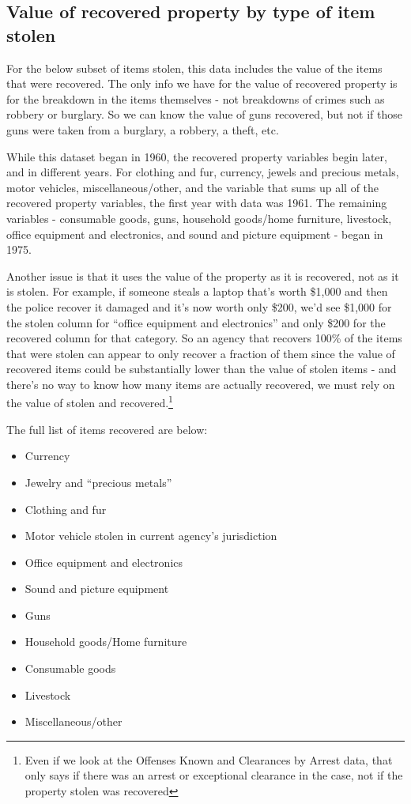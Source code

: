\documentclass[
]{krantz}
\providecommand{\tightlist}{%
  \setlength{\itemsep}{0pt}\setlength{\parskip}{0pt}}
\begin{document}
\subsection{Value of recovered property by type of item
stolen}\label{value-of-recovered-property-by-type-of-item-stolen}

For the below subset of items stolen, this data includes the
value of the items that were recovered. The only info we
have for the value of recovered property is for the
breakdown in the items themselves - not breakdowns of crimes
such as robbery or burglary. So we can know the value of
guns recovered, but not if those guns were taken from a
burglary, a robbery, a theft, etc.

While this dataset began in 1960, the recovered property
variables begin later, and in different years. For clothing
and fur, currency, jewels and precious metals, motor
vehicles, miscellaneous/other, and the variable that sums up
all of the recovered property variables, the first year with
data was 1961. The remaining variables - consumable goods,
guns, household goods/home furniture, livestock, office
equipment and electronics, and sound and picture equipment -
began in 1975.

Another issue is that it uses the value of the property as
it is recovered, not as it is stolen. For example, if
someone steals a laptop that's worth \$1,000 and then the
police recover it damaged and it's now worth only \$200,
we'd see \$1,000 for the stolen column for ``office
equipment and electronics'' and only \$200 for the recovered
column for that category. So an agency that recovers 100\%
of the items that were stolen can appear to only recover a
fraction of them since the value of recovered items could be
substantially lower than the value of stolen items - and
there's no way to know how many items are actually
recovered, we must rely on the value of stolen and
recovered.\footnote{Even if we look at the Offenses Known
  and Clearances by Arrest data, that only says if there was
  an arrest or exceptional clearance in the case, not if the
  property stolen was recovered}

The full list of items recovered are below:

\begin{itemize}
\tightlist
\item
  Currency
\item
  Jewelry and ``precious metals''
\item
  Clothing and fur
\item
  Motor vehicle stolen in current agency's jurisdiction
\item
  Office equipment and electronics
\item
  Sound and picture equipment
\item
  Guns
\item
  Household goods/Home furniture
\item
  Consumable goods
\item
  Livestock
\item
  Miscellaneous/other
\end{itemize}
\end{document}
